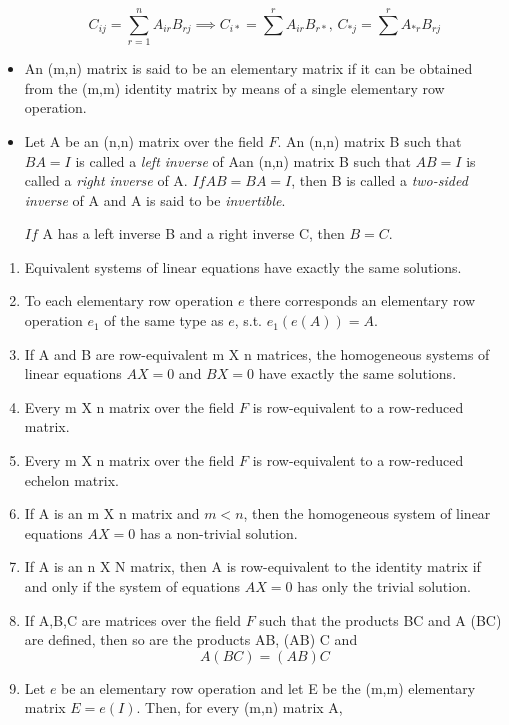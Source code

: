 \documentclass[12pt, a4paper]{article}
\begin{document}
\begin{CJK*}{UTF8}{bsmi}
\begin{itemize}
\begin{equation}
        C_{ij} = \sum_{r=1}^n A_{ir}B_{rj} \implies C_{i*} = \sum^r A_{ir}B_{r*},\, C_{*j}=\sum^r A_{*r}B_{rj} 
    \end{equation}
    \item An (m,n) matrix is said to be an elementary matrix if it can be obtained from the (m,m) identity matrix by means of a single elementary row operation.
    \item Let A be an (n,n) matrix over the field \(F\). An (n,n) matrix B such that \(BA=I\) is called a \emph{left inverse} of A\@ an (n,n) matrix B such that \(AB=I\) is called a \emph{right inverse} of A. \(If AB=BA=I\), then B is called a \emph{two-sided inverse} of A and A is said to be \emph{invertible}.
    
     \(If\) A has a left inverse B and a right inverse C, then \(B=C\).
\end{itemize}
\begin{enumerate}
    \item Equivalent systems of linear equations have exactly the same solutions.
    \item To each elementary row operation \(e\) there corresponds an elementary row operation \(e_1\) of the same type as \(e\), s.t. \(e_1(e(A))=A\).
    \item If A and B are row-equivalent m X n matrices, the homogeneous systems of linear equations \(AX=0\) and \(BX=0\) have exactly the same solutions.
    \item Every m X n matrix over  the field \(F\) is row-equivalent to a row-reduced matrix.
    \item Every m X n matrix over  the field \(F\) is row-equivalent to a row-reduced echelon matrix.
    \item If A is an m X n matrix and \(m<n\), then the homogeneous system of linear equations \(AX=0\) has a non-trivial solution.
    \item If A is an n X N matrix, then A is row-equivalent to the identity matrix if and only if the system of equations \(AX=0\) has only the trivial solution.
    \item If A,B,C are matrices over the field \(F\) such that the products BC and A (BC) are defined, then so are the products AB, (AB) C and\begin{equation}
        A(BC) = (AB)C
    \end{equation}
    \item Let \(e\) be an elementary row operation and let E be the (m,m) elementary matrix \(E=e(I)\). Then, for every (m,n) matrix A,\begin{equation}

\end{equation}
\end{enumerate}
\end{CJK*}
\end{document}
